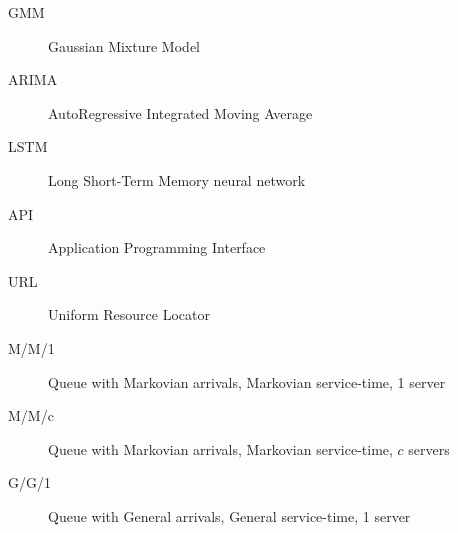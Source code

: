 \begin{description}
\item[GMM] Gaussian Mixture Model
\item[ARIMA] AutoRegressive Integrated Moving Average
\item[LSTM] Long Short-Term Memory neural network
\item[API] Application Programming Interface
\item[URL] Uniform Resource Locator
\item[M/M/1] Queue with Markovian arrivals, Markovian service-time, 1 server
\item[M/M/c] Queue with Markovian arrivals, Markovian service-time, $c$ servers
\item[G/G/1] Queue with General arrivals, General service-time, 1 server
\end{description}

